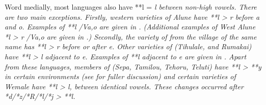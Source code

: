 \clearpage\newpage
Word medially, most languages also have **l = \it{l} between non-high vowels.
There are two main exceptions.
Firstly, western varieties of Alune have **l > \it{r} before \it{a} and \it{o}.
Examples of **l /V{\gap}\it{a,o} are given in .
(Additional examples of West Alune *l > \it{r} /V{\gap}a,o are
given in .) Secondly,
the variety of  from the village of the same name
has **l > \it{r} before or after \it{e}.
 Other varieties of  (Tihulale,
and Rumakai) have **l > \it{l} adjacent to \it{e}.
Examples of **l adjacent to \it{e} are given in .
Apart from these languages,
members of  (Sepa,
Tamilou, Tehoru, Teluti) have **l > **y in certain environments
(see  for fuller discussion)
and certain varieties of Wemale have **l > \it{l},
{\0} between identical vowels.
These changes occurred after *d/*z/*R/*l/*j > **l.

